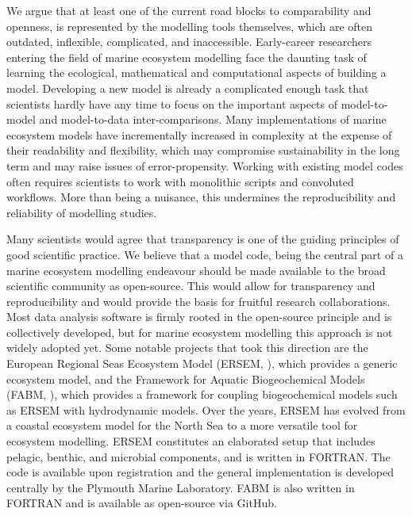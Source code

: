 \documentclass[journal abbreviation, manuscript]{copernicus}
\begin{document}
We argue that at least one of the current road blocks to comparability and openness, is represented by the modelling tools themselves, which are often outdated, inflexible, complicated, and inaccessible. Early-career researchers entering the field of marine ecosystem modelling face the daunting task of learning the ecological, mathematical and computational aspects of building a model. Developing a new model is already a complicated enough task that scientists hardly have any time to focus on the important aspects of model-to-model and model-to-data inter-comparisons. Many implementations of marine ecosystem models have incrementally increased in complexity at the expense of their readability and flexibility, which may compromise sustainability in the long term and may raise issues of error-propensity. Working with existing model codes often requires scientists to work with monolithic scripts and convoluted workflows. More than being a nuisance, this undermines the reproducibility and reliability of modelling studies.

Many scientists would agree that transparency is one of the guiding principles of good scientific practice. We believe that a model code, being the central part of a marine ecosystem modelling endeavour should be made available to the broad scientific community as open-source. This would allow for transparency and reproducibility and would provide the basis for fruitful research collaborations. Most data analysis software is firmly rooted in the open-source principle and is collectively developed, but for marine ecosystem modelling this approach is not widely adopted yet. Some notable projects that took this direction are the European Regional Seas Ecosystem Model (ERSEM, \citet{Butenschon2016}), which provides a generic ecosystem model, and the Framework for Aquatic Biogeochemical Models (FABM, \citet{Bruggeman2014a}), which provides a framework for coupling biogeochemical models such as ERSEM with hydrodynamic models. Over the years, ERSEM has evolved from a coastal ecosystem model for the North Sea to a more versatile tool for ecosystem modelling. ERSEM constitutes an elaborated setup that includes pelagic, benthic, and microbial components, and is written in FORTRAN. The code is available upon registration and the general implementation is developed centrally by the Plymouth Marine Laboratory. FABM is also written in FORTRAN and is available as open-source via GitHub.
\end{document}

